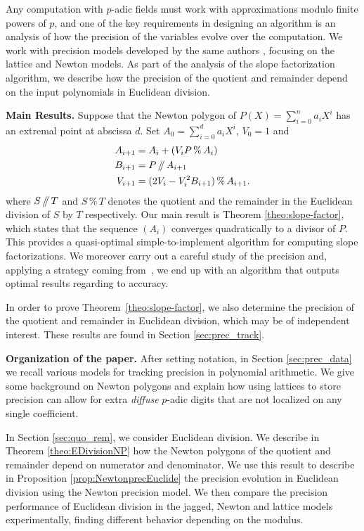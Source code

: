 \documentclass{sig-alternate-05-2015}
\renewcommand{\mod}{\,\%\,}
\renewcommand{\div}{\,/\hspace{-0.3em}/\,}
\begin{document}
Any computation with $p$-adic fields must work with approximations modulo finite
powers of $p$, and one of the key requirements in designing an algorithm is
an analysis of how the precision of the variables evolve over the computation.
We work with precision models developed by the same authors
\cite[Section~4.2]{caruso-roe-vaccon:14a}, focusing on the lattice and Newton models.
As part of the analysis of the slope factorization algorithm, we describe
how the precision of the quotient and remainder depend on the input polynomials
in Euclidean division.

\medskip

\noindent
{\bf Main Results.}
%
Suppose that the Newton polygon of $P(X) = \sum_{i=0}^n a_i X^i$
has an extremal point at abscissa $d$.
Set $A_0 = \sum_{i=0}^d a_i X^i$, $V_0 = 1$ and
\begin{align*}
A_{i+1} &= A_i + (V_i P \mod A_i) \\
B_{i+1} &= P \div A_{i+1} \\
V_{i+1} &= (2V_i - V_i^2B_{i+1}) \mod A_{i+1}.
\end{align*}
where $S \div T$ and $S \mod T$ denotes the quotient and the
remainder in the Euclidean division of $S$ by $T$ respectively.
Our main result is Theorem \ref{theo:slope-factor},
which states that the sequence $(A_i)$ converges quadratically
to a divisor of $P$. This provides a quasi-optimal simple-to-implement 
algorithm for computing slope factorizations.
We moreover carry out a careful study of the precision and, applying
a strategy coming from~\cite{caruso-roe-vaccon:14a}, we end up with
an algorithm that outputs optimal results regarding to accuracy.

In order to prove Theorem~\ref{theo:slope-factor}, we also determine
the precision of the quotient and remainder in Euclidean division,
which may be of independent interest.  These results are found in
Section \ref{sec:prec_track}.

\medskip

\noindent
{\bf Organization of the paper.}
%
After setting notation, in
Section \ref{sec:prec_data} we recall various models for tracking
precision in polynomial arithmetic.  We give some background
on Newton polygons and explain how using lattices to store
precision can allow for extra \emph{diffuse} $p$-adic digits that
are not localized on any single coefficient.

In Section \ref{sec:quo_rem}, we consider Euclidean division.
We describe in Theorem \ref{theo:EDivisionNP}
how the Newton polygons of the quotient and remainder
depend on numerator and denominator.  We use this
result to describe in Proposition \ref{prop:NewtonprecEuclide}
the precision evolution in Euclidean division using
the Newton precision model.  We then compare the
precision performance of Euclidean division in the
jagged, Newton and lattice models experimentally,
finding different behavior depending on the modulus.
\end{document}
